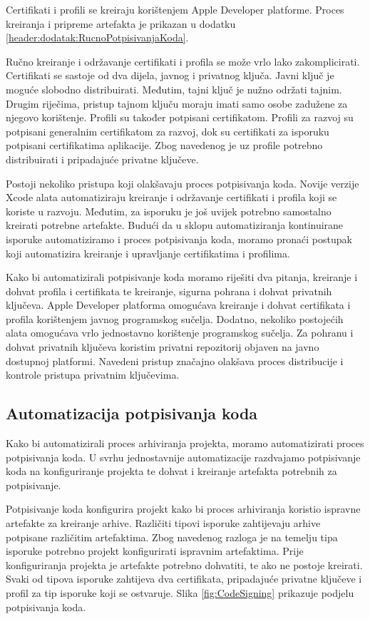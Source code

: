 \documentclass[times, utf8, diplomski, numeric]{fer}
\begin{document}
Certifikati i profili se kreiraju korištenjem Apple Developer platforme. Proces kreiranja i pripreme artefakta je prikazan u dodatku \ref{header:dodatak:RucnoPotpisivanjaKoda}.

Ručno kreiranje i održavanje certifikati i profila se može vrlo lako zakomplicirati. Certifikati se sastoje od dva dijela, javnog i privatnog ključa. Javni ključ je moguće slobodno distribuirati. Međutim, tajni ključ je nužno održati tajnim. Drugim riječima, pristup tajnom ključu moraju imati samo osobe zadužene za njegovo korištenje. Profili su također potpisani certifikatom. Profili za razvoj su potpisani generalnim certifikatom za razvoj, dok su certifikati za isporuku potpisani certifikatima aplikacije. Zbog navedenog je uz profile potrebno distribuirati i pripadajuće privatne ključeve.

Postoji nekoliko pristupa koji olakšavaju proces potpisivanja koda. Novije verzije Xcode alata automatiziraju kreiranje i održavanje certifikati i profila koji se koriste u razvoju. Međutim, za isporuku je još uvijek potrebno samostalno kreirati potrebne artefakte. Budući da u sklopu automatiziranja kontinuirane isporuke automatiziramo i proces potpisivanja koda, moramo pronaći postupak koji automatizira kreiranje i upravljanje certifikatima i profilima.

Kako bi automatizirali potpisivanje koda moramo riješiti dva pitanja, kreiranje i dohvat profila i certifikata te kreiranje, sigurna pohrana i dohvat privatnih ključeva. Apple Developer platforma omogućava kreiranje i dohvat certifikata i profila korištenjem javnog programskog sučelja. Dodatno, nekoliko postojećih alata omogućava vrlo jednostavno korištenje programskog sučelja. Za pohranu i dohvat privatnih ključeva koristim privatni repozitorij objaven na javno dostupnoj platformi. Navedeni pristup značajno olakšava proces distribucije i kontrole pristupa privatnim ključevima.

\subsection{Automatizacija potpisivanja koda}

Kako bi automatizirali proces arhiviranja projekta, moramo automatizirati proces potpisivanja koda. U svrhu jednostavnije automatizacije razdvajamo potpisivanje koda na konfiguriranje projekta te dohvat i kreiranje artefakta potrebnih za potpisivanje.

Potpisivanje koda konfigurira projekt kako bi proces arhiviranja koristio ispravne artefakte za kreiranje arhive. Različiti tipovi isporuke zahtijevaju arhive potpisane različitim artefaktima. Zbog navedenog razloga je na temelju tipa isporuke potrebno projekt konfigurirati ispravnim artefaktima. Prije konfiguriranja projekta je artefakte potrebno dohvatiti, te ako ne postoje kreirati. Svaki od tipova isporuke zahtijeva dva certifikata, pripadajuće privatne ključeve i profil za tip isporuke koji se ostvaruje. Slika \ref{fig:CodeSigning} prikazuje podjelu potpisivanja koda.
\end{document}
